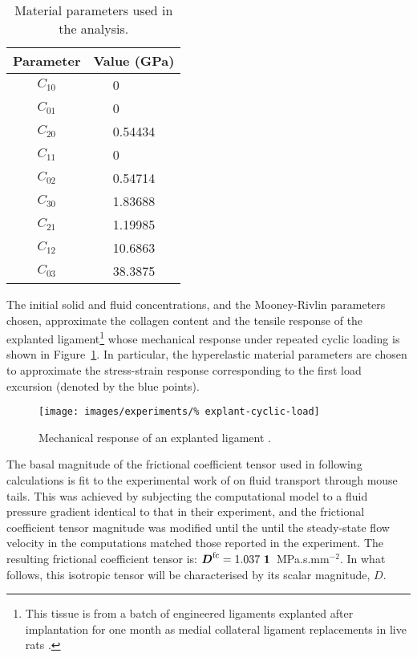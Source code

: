 \begin{table}[!hptb]
  \centering
  \begin{tabular}{|c|c|}
    \hline Parameter & Value (GPa) \\
    \hline \hline
    $C_{10}$  &   0$\phantom{.00000}$  \\
    $C_{01}$  &   0$\phantom{.00000}$  \\
    $C_{20}$  &   0.54434  \\
    $C_{11}$  &   0$\phantom{.00000}$  \\
    $C_{02}$  &   0.54714  \\
    $C_{30}$  &   1.83688  \\
    $C_{21}$  &   1.19985  \\
    $C_{12}$  &   10.6863  \\
    $C_{03}$  &   38.3875  \\
    \hline
  \end{tabular}
  \caption{Material parameters used in the analysis.}
  \label{parameters-explant}
\end{table}

The initial solid and fluid concentrations, and the Mooney-Rivlin
parameters chosen, approximate the collagen content and the tensile
response of the explanted ligament\footnote{This tissue is from a
  batch of engineered ligaments explanted after implantation for one
  month as medial collateral ligament replacements in live rats
  \citep{Syed-Picard:06}.} whose mechanical response under repeated
cyclic loading is shown in Figure~\ref{explanted-ligament}. In
particular, the hyperelastic material parameters are chosen to
approximate the stress-strain response corresponding to the first load
excursion (denoted by the blue points).

\begin{figure}[!hptb]
  \centering
  \texttt{[image: images/experiments/\%
    explant-cyclic-load]}
  \caption{Mechanical response of an explanted ligament
    \citep{Syed-Picard:06}.}
  \label{explanted-ligament}
\end{figure}

The basal magnitude of the frictional coefficient tensor used in
following calculations is fit to the experimental work of
\citet{Swartzetal:99} on fluid transport through mouse tails. This was
achieved by subjecting the computational model to a fluid pressure
gradient identical to that in their experiment, and the frictional
coefficient tensor magnitude was modified until the until the
steady-state flow velocity in the computations matched those reported
in the experiment. The resulting frictional coefficient tensor is:
$\bD^{\mathrm{fc}} = 1.037 \ \bone$~MPa.s.mm$^{-2}$. In what follows,
this isotropic tensor will be characterised by its scalar magnitude,
$D$.

